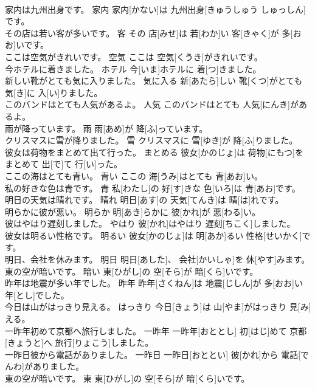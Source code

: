 \documentclass[8pt]{extreport}
\begin{document}
\begin{CJK}{UTF8}{min}
\\	家内は九州出身です。	家内	家内[かない]は 九州出身[きゅうしゅう しゅっしん]です。	
\\	その店は若い客が多いです。	客	その 店[みせ]は 若[わか]い 客[きゃく]が 多[おお]いです。	
\\	ここは空気がきれいです。	空気	ここは 空気[くうき]がきれいです。	
\\	今ホテルに着きました。	ホテル	今[いま]ホテルに 着[つ]きました。	
\\	新しい靴がとても気に入りました。	気に入る	新[あたら]しい 靴[くつ]がとても 気[き]に 入[い]りました。	
\\	このバンドはとても人気があるよ。	人気	このバンドはとても 人気[にんき]があるよ。	
\\	雨が降っています。	雨	雨[あめ]が 降[ふ]っています。	
\\	クリスマスに雪が降りました。	雪	クリスマスに 雪[ゆき]が 降[ふ]りました。	
\\	彼女は荷物をまとめて出て行った。	まとめる	彼女[かのじょ]は 荷物[にもつ]をまとめて 出[で]て 行[い]った。	
\\	ここの海はとても青い。	青い	ここの 海[うみ]はとても 青[あお]い。	
\\	私の好きな色は青です。	青	私[わたし]の 好[す]きな 色[いろ]は 青[あお]です。	
\\	明日の天気は晴れです。	晴れ	明日[あす]の 天気[てんき]は 晴[は]れです。	
\\	明らかに彼が悪い。	明らか	明[あき]らかに 彼[かれ]が 悪[わる]い。	
\\	彼はやはり遅刻しました。	やはり	彼[かれ]はやはり 遅刻[ちこく]しました。	
\\	彼女は明るい性格です。	明るい	彼女[かのじょ]は 明[あか]るい 性格[せいかく]です。	
\\	明日、会社を休みます。	明日	明日[あした]、 会社[かいしゃ]を 休[やす]みます。	
\\	東の空が暗いです。	暗い	東[ひがし]の 空[そら]が 暗[くら]いです。	
\\	昨年は地震が多い年でした。	昨年	昨年[さくねん]は 地震[じしん]が 多[おお]い 年[とし]でした。	
\\	今日は山がはっきり見える。	はっきり	今日[きょう]は 山[やま]がはっきり 見[み]える。	
\\	一昨年初めて京都へ旅行しました。	一昨年	一昨年[おととし] 初[はじ]めて 京都[きょうと]へ 旅行[りょこう]しました。	
\\	一昨日彼から電話がありました。	一昨日	一昨日[おととい] 彼[かれ]から 電話[でんわ]がありました。	
\\	東の空が暗いです。	東	東[ひがし]の 空[そら]が 暗[くら]いです。	

\end{CJK}
\end{document}
